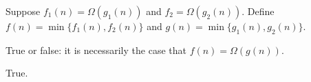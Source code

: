 \begin{prob}
    Suppose $f_1(n) = \Omega(g_1(n))$ and $f_2 = \Omega(g_2(n))$.
    Define $f(n) = \min \{ f_1(n), f_2(n) \}$ and $g(n) = \min \{ g_1(n), g_2(n)\}$.

    True or false: it is necessarily the case that $f(n) = \Omega(g(n))$.

     \Tf{}

     \begin{soln}
         True.
     \end{soln}
\end{prob}
